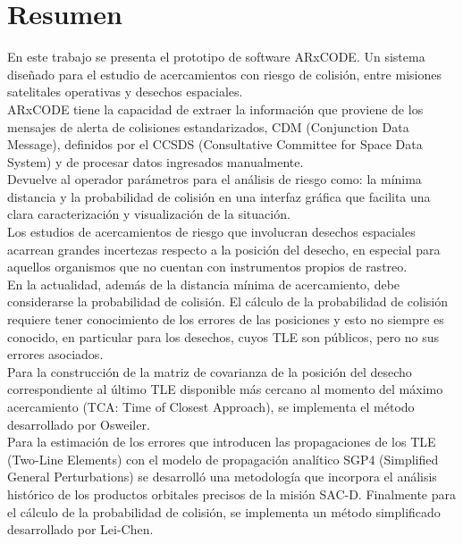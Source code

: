 \chapter*{Resumen}
\label{chap:resumen}
En este trabajo se presenta el prototipo de software ARxCODE. Un sistema dise\~nado para el estudio de acercamientos con riesgo de colisi\'on, entre misiones satelitales operativas y desechos espaciales.\\

ARxCODE tiene la capacidad de extraer la informaci\'on que proviene de los mensajes de alerta de colisiones estandarizados, CDM (Conjunction Data Message), definidos por el CCSDS (Consultative Committee for Space Data System) y de procesar datos ingresados manualmente.\\
Devuelve al operador par\'ametros para el an\'alisis de riesgo como: la m\'inima distancia y la probabilidad de colisi\'on en una interfaz gr\'afica que facilita una clara caracterizaci\'on y visualizaci\'on de la situaci\'on.\\

Los estudios de acercamientos de riesgo que involucran desechos espaciales acarrean grandes incertezas respecto a la posici\'on del desecho, en especial para aquellos organismos que no cuentan con instrumentos propios de rastreo.\\
En la actualidad, adem\'as de la distancia m\'inima de acercamiento, debe considerarse la probabilidad de colisi\'on. El c\'alculo de la probabilidad de colisi\'on requiere tener conocimiento de los errores de las posiciones y esto no siempre es conocido, en particular para los desechos, cuyos TLE son p\'ublicos, pero no sus errores asociados.\\

Para la construcci\'on de la matriz de covarianza de la posici\'on del desecho correspondiente al \'ultimo TLE disponible m\'as cercano al momento del m\'aximo acercamiento (TCA: Time of Closest Approach), se implementa el m\'etodo desarrollado por Osweiler.\\
Para la estimaci\'on de los errores que introducen las propagaciones de los TLE (Two-Line Elements) con el modelo de propagaci\'on anal\'itico SGP4 (Simplified General Perturbations) se desarroll\'o una metodolog\'ia que incorpora el análisis hist\'orico de los productos orbitales precisos de la misi\'on SAC-D.
Finalmente para el c\'alculo de la probabilidad de colisi\'on, se implementa un m\'etodo simplificado desarrollado por Lei-Chen.\\

